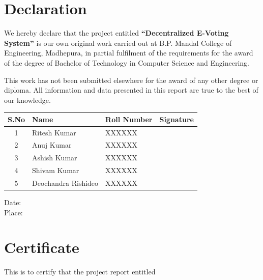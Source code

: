 \documentclass[12pt,a4paper]{report}
\begin{document}
\chapter*{Declaration}

We hereby declare that the project entitled
\textbf{``Decentralized E-Voting System''}
is our own original work carried out at B.P. Mandal College of Engineering, Madhepura,
in partial fulfilment of the requirements for the award of the degree of
Bachelor of Technology in Computer Science and Engineering.

This work has not been submitted elsewhere for the award of any other degree or diploma.
All information and data presented in this report are true to the best of our knowledge.

\vspace{2cm}

\begin{tabular}{|c|l|l|l|}
\hline
S.No & Name               & Roll Number & Signature \\
\hline
1    & Ritesh Kumar       & XXXXXX      &           \\
\hline
2    & Anuj Kumar         & XXXXXX      &           \\
\hline
3    & Ashish Kumar       & XXXXXX      &           \\
\hline
4    & Shivam Kumar       & XXXXXX      &           \\
\hline
5    & Deochandra Rishideo & XXXXXX     &           \\
\hline
\end{tabular}

\vspace{2cm}

\noindent
Date: \underline{\hspace{4cm}} \\[0.4cm]
Place: \underline{\hspace{4cm}}

\newpage

\chapter*{Certificate}

This is to certify that the project report entitled
\end{document}
